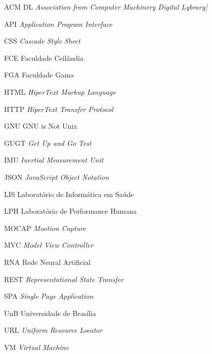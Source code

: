 \begin{siglas}
	\item[ACM DL] \emph{Association from Computer Machinery Digital Lybrary]}
	\item[API] \emph{Application Program Interface}
	\item[CSS] \emph{Cascade Style Sheet}
	\item[FCE] Faculdade Ceilândia 
	\item[FGA] Faculdade Gama
	\item[HTML] \emph{HiperText Markup Language}
	\item[HTTP] \emph{HiperText Transfer Protocol}
	\item[GNU] GNU is Not Unix
	\item[GUGT] \emph{Get Up and Go Test}
	\item[IMU] \emph{Inertial Measurement Unit}
	\item[JSON] \emph{JavaScript Object Notation} 
	\item[LIS] Laboratório de Informática em Saúde
	\item[LPH] Laboratório de Performance Humana
	\item[MOCAP] \emph{Mootion Capture}
	\item[MVC] \emph{Model View Controller}
	\item[RNA] Rede Neural Artificial
	\item[REST] \emph{Representational State Transfer}
	\item[SPA] \emph{Single Page Application}
	\item[UnB] Universidade de Brasília
	\item[URL] \emph{Uniform Resource Locator}
	\item[VM] \emph{Virtual Machine}


\end{siglas}
